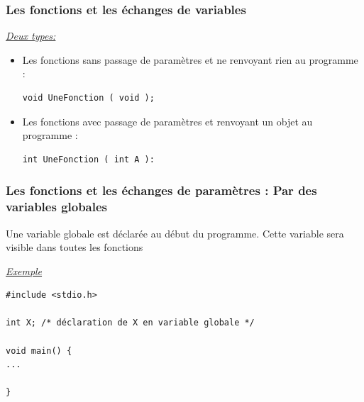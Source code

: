 \documentclass{beamer}
\begin{document}
\begin{frame}[fragile]
\frametitle{Les fonctions et les échanges de variables }
\underline {\em Deux types:}

\begin{itemize}
\item Les fonctions sans passage de paramètres et ne renvoyant rien au programme :    
		
\begin{verbatim}
void UneFonction ( void ); 
\end{verbatim}
\item Les fonctions avec passage de paramètres et renvoyant un objet au programme :
		
\begin{verbatim}
int UneFonction ( int A ): 
\end{verbatim} 

\end{itemize}


\end{frame}


\begin{frame}[fragile]
\frametitle{Les fonctions et les échanges de paramètres : Par des variables globales}

    Une variable globale est déclarée au début du programme.
    Cette variable sera visible dans toutes les fonctions

    \underline {\em Exemple}
	
\begin{verbatim}
#include <stdio.h>

int X; /* déclaration de X en variable globale */

void main() {
...

}
\end{verbatim}

\end{frame}
\end{document}
